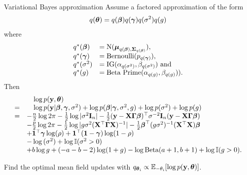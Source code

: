 \documentclass{beamer}
\begin{document}
\begin{frame}{Variational Bayes approximation}
Assume a factored approximation of the form
\begin{equation*}
q({\boldsymbol \theta}) = q({\boldsymbol \beta}) q({\boldsymbol \gamma}) q(\sigma^2) q(g)
\end{equation*}
where
\begin{equation*}
\begin{array}{ll}
q^*({\boldsymbol \beta}) &= \text{N}({\boldsymbol \mu}_{q({\boldsymbol \beta}), {\boldsymbol \Sigma}_{q({\boldsymbol \beta})}}), \\
q^*({\boldsymbol \gamma}) &= \text{Bernoulli}(p_{q({\boldsymbol \gamma})}), \\
q^*(\sigma^2) &= \text{IG}(\alpha_{q(\sigma^2)}, \beta_{q(\sigma^2)}) \text{ and } \\
q^*(g) &= \text{Beta Prime}(\alpha_{q(g)}, \beta_{q(g)})). \\
\end{array}
\end{equation*}
Then
\begin{equation*}
\begin{array}{rl}
&\quad \log{p({\bf y}, {\boldsymbol\theta})} \\
=& \quad \log{p({\bf y}| {\boldsymbol\beta}, {\boldsymbol\gamma}, \sigma^2)} + \log{p({\boldsymbol\beta}| {\boldsymbol\gamma}, \sigma^2, g)} + \log{p(\sigma^2)} + \log{p(g)} \\
=& -\frac{n}{2} \log{2 \pi} -\tfrac{1}{2} \log |\sigma^2 {\bf I}_n| - \tfrac{1}{2} ({\bf y} - {\bf X} {\boldsymbol{\Gamma}} {\boldsymbol \beta})^\top \sigma^{-2} {\bf I}_n ({\bf y} - {\bf X} {\boldsymbol{\Gamma}} {\boldsymbol \beta}) \\
& -\frac{p}{2} \log{2 \pi} - \tfrac{1}{2} \log |g \sigma^2 ({\bf X}^\top {\boldsymbol{\Gamma}} {\bf X})^{-1}| -
	\tfrac{1}{2} {\boldsymbol \beta}^\top (g \sigma^2)^{-1} ({\bf X}^\top {\bf X}) {\boldsymbol \beta} \\
& + {\bf 1}^\top {\boldsymbol\gamma} \log(\rho) + {\bf 1}^\top ({\bf 1} - {\boldsymbol \gamma}) \log(1 - \rho)\\
& - \log{(\sigma^2)} + \log {\mathbb I} (\sigma^2 > 0) \\
& + b \log g + (-a - b - 2) \log(1 + g) - \log \text{Beta}(a + 1,  b + 1) + \log {\mathbb I}(g > 0).
\end{array}
\end{equation*}

\small Find the optimal mean field updates with $q_{{\boldsymbol \theta}_i} \propto {\mathbb E}_{-\theta_i} [\log p({\bf y}, {\boldsymbol \theta})]$.

\end{frame}
\end{document}
